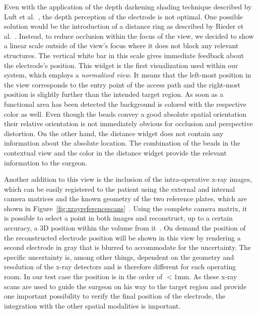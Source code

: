 \documentclass[review]{vgtc}                 %
\begin{document}
Even with the application of the depth darkening shading technique described by Luft et al.~\cite{Luft2005}, the depth perception of the electrode is not optimal. One possible solution would be the introduction of a distance ring as described by Rieder et al.~\cite{Rieder2008}. Instead, to reduce occlusion within the focus of the view, we decided to show a linear scale outside of the view's focus where it does not block any relevant structures. The vertical white bar in this scale gives immediate feedback about the electrode's position. This widget is the first visualization used within our system, which employs a \emph{normalized view}. It means that the left-most position in the view corresponds to the entry point of the access path and the right-most position is slightly further than the intended target region. As soon as a functional area has been detected the background is colored with the respective color as well. Even though the beads convey a good absolute spatial orientation their relative orientation is not immediately obvious for occlusion and perspective distortion. On the other hand, the distance widget does not contain any information about the absolute location. The combination of the beads in the contextual view and the color in the distance widget provide the relevant information to the surgeon.

Another addition to this view is the inclusion of the intra-operative x-ray images, which can be easily registered to the patient using the external and internal camera matrices and the known geometry of the two reference plates, which are shown in Figure~\ref{fig:xrayreferencescans}~\cite{Caprile1990,Zheng2008}. Using the complete camera matrix, it is possible to select a point in both images and reconstruct, up to a certain accuracy, a 3D position within the volume from it~\cite{Hartley2004}. On demand the position of the reconstructed electrode position will be shown in this view by rendering a second electrode in gray that is blurred to accommodate for the uncertainty. The specific uncertainty is, among other things, dependent on the geometry and resolution of the x-ray detectors and is therefore different for each operating room. In our test case the position is in the order of $< 1$mm. As these x-ray scans are used to guide the surgeon on his way to the target region and provide one important possibility to verify the final position of the electrode, the integration with the other spatial modalities is important.
\end{document}
